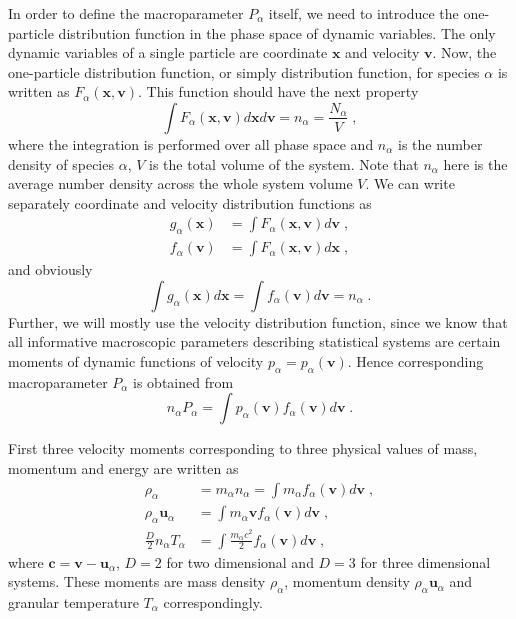 \documentclass[preprint, aps, pra]{revtex4-1}
\newcommand{\bx}{{\bm{x}}}
\newcommand{\bv}{{\bm{v}}}
\newcommand{\bu}{{\bm{u}}}
\newcommand{\bc}{{\bm{c}}}
\begin{document}
In order to define the macroparameter $P_\alpha$ itself, we need to introduce the one-particle distribution function in the phase
space of dynamic variables. The only dynamic variables of a single particle are coordinate $\bx$ and velocity $\bv$.
Now, the one-particle distribution function, or simply distribution function, for species $\alpha$ is written as $F_{\alpha}(\bx,\bv)$.
This function should have the next property
\begin{equation}
  \int F_\alpha(\bx,\bv)d\bx d\bv = n_\alpha = \frac{N_\alpha}{V}\;,
\end{equation}
where the integration is performed over all phase space and $n_\alpha$ is the number density of species $\alpha$, $V$ is the total volume 
of the system. Note that $n_\alpha$ here is the average number density across the whole system volume $V$. We can write separately 
coordinate and velocity distribution functions as 
\begin{equation}
  \begin{split}
    g_\alpha(\bx) &= \int F_\alpha(\bx,\bv)d\bv\;,\\
    f_\alpha(\bv) &= \int F_\alpha(\bx,\bv)d\bx\;,
  \end{split}
\end{equation}
and obviously
\begin{equation}
  \int g_\alpha(\bx)d\bx = \int f_\alpha(\bv)d\bv = n_\alpha\;.
\end{equation}
Further, we will mostly use the velocity distribution function, since we know that all informative
macroscopic parameters describing statistical systems are certain moments of dynamic functions of velocity $p_\alpha=p_\alpha(\bv)$.
Hence corresponding macroparameter $P_\alpha$ is obtained from
\begin{equation}
  n_\alpha P_\alpha = \int p_\alpha(\bv)f_\alpha(\bv)d\bv\;.
\end{equation}

First three velocity moments corresponding to three physical values of mass, momentum and energy are written as 
\begin{equation}
  \begin{split}
    \rho_\alpha &= m_\alpha n_\alpha = \int m_\alpha f_\alpha(\bv)d\bv\;,\\
    \rho_\alpha \bu_\alpha &= \int m_\alpha\bv f_\alpha(\bv)d\bv\;,\\
    \frac{D}{2}n_\alpha T_\alpha &= \int \frac{m_\alpha c^2}{2}f_\alpha(\bv)d\bv\;,
  \end{split}
\end{equation}
where $\bc=\bv-\bu_\alpha$, $D=2$ for two dimensional and $D=3$ for three dimensional systems. These moments are mass density $\rho_\alpha$,
momentum density $\rho_\alpha\bu_\alpha$ and granular temperature $T_\alpha$ correspondingly. 
\end{document}
